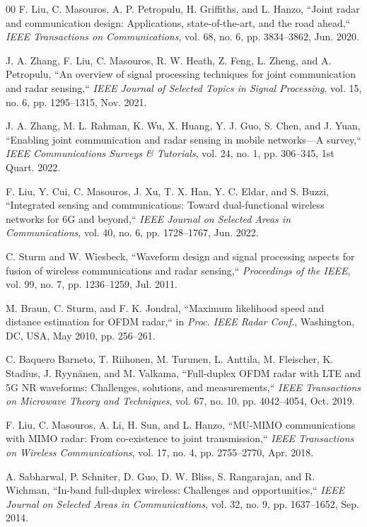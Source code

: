 \documentclass[conference]{IEEEtran}
\begin{document}
\begin{thebibliography}{00}
F. Liu, C. Masouros, A. P. Petropulu, H. Griffiths, and L. Hanzo, ``Joint radar and communication design: Applications, state-of-the-art, and the road ahead,`` \emph{IEEE Transactions on Communications}, vol. 68, no. 6, pp. 3834--3862, Jun. 2020.

J. A. Zhang, F. Liu, C. Masouros, R. W. Heath, Z. Feng, L. Zheng, and A. Petropulu, ``An overview of signal processing techniques for joint communication and radar sensing,`` \emph{IEEE Journal of Selected Topics in Signal Processing}, vol. 15, no. 6, pp. 1295--1315, Nov. 2021.

J. A. Zhang, M. L. Rahman, K. Wu, X. Huang, Y. J. Guo, S. Chen, and J. Yuan, ``Enabling joint communication and radar sensing in mobile networks---A survey,`` \emph{IEEE Communications Surveys \& Tutorials}, vol. 24, no. 1, pp. 306--345, 1st Quart. 2022.

F. Liu, Y. Cui, C. Masouros, J. Xu, T. X. Han, Y. C. Eldar, and S. Buzzi, ``Integrated sensing and communications: Toward dual-functional wireless networks for 6G and beyond,`` \emph{IEEE Journal on Selected Areas in Communications}, vol. 40, no. 6, pp. 1728--1767, Jun. 2022.

C. Sturm and W. Wiesbeck, ``Waveform design and signal processing aspects for fusion of wireless communications and radar sensing,`` \emph{Proceedings of the IEEE}, vol. 99, no. 7, pp. 1236--1259, Jul. 2011.

M. Braun, C. Sturm, and F. K. Jondral, ``Maximum likelihood speed and distance estimation for OFDM radar,`` in \emph{Proc. IEEE Radar Conf.}, Washington, DC, USA, May 2010, pp. 256--261.

C. Baquero Barneto, T. Riihonen, M. Turunen, L. Anttila, M. Fleischer, K. Stadius, J. Ryyn\"anen, and M. Valkama, ``Full-duplex OFDM radar with LTE and 5G NR waveforms: Challenges, solutions, and measurements,`` \emph{IEEE Transactions on Microwave Theory and Techniques}, vol. 67, no. 10, pp. 4042--4054, Oct. 2019.

F. Liu, C. Masouros, A. Li, H. Sun, and L. Hanzo, ``MU-MIMO communications with MIMO radar: From co-existence to joint transmission,`` \emph{IEEE Transactions on Wireless Communications}, vol. 17, no. 4, pp. 2755--2770, Apr. 2018.

A. Sabharwal, P. Schniter, D. Guo, D. W. Bliss, S. Rangarajan, and R. Wichman, ``In-band full-duplex wireless: Challenges and opportunities,`` \emph{IEEE Journal on Selected Areas in Communications}, vol. 32, no. 9, pp. 1637--1652, Sep. 2014.


\end{thebibliography}
\end{document}

